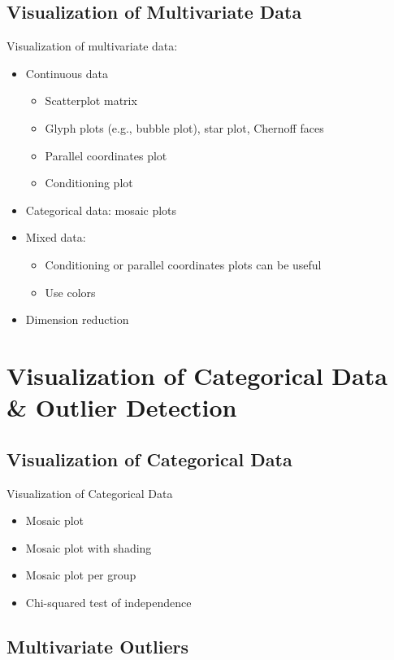 \documentclass[a4paper]{article}
\begin{document}
\subsection{Visualization of Multivariate Data}

Visualization of multivariate data:
\begin{itemize}
    \item Continuous data
    \begin{itemize}
        \item Scatterplot matrix
        \item Glyph plots (e.g., bubble plot), star plot, Chernoff faces
        \item Parallel coordinates plot
        \item Conditioning plot
    \end{itemize}
    \item Categorical data: mosaic plots
    \item Mixed data:
    \begin{itemize}
        \item Conditioning or parallel coordinates plots can be useful
        \item Use colors
    \end{itemize}
    \item Dimension reduction
\end{itemize}

\section{Visualization of Categorical Data \& Outlier Detection}

\subsection{Visualization of Categorical Data}

Visualization of Categorical Data
\begin{itemize}
    \item Mosaic plot
    \item Mosaic plot with shading
    \item Mosaic plot per group
    \item Chi-squared test of independence
\end{itemize}

\subsection{Multivariate Outliers}
\end{document}
